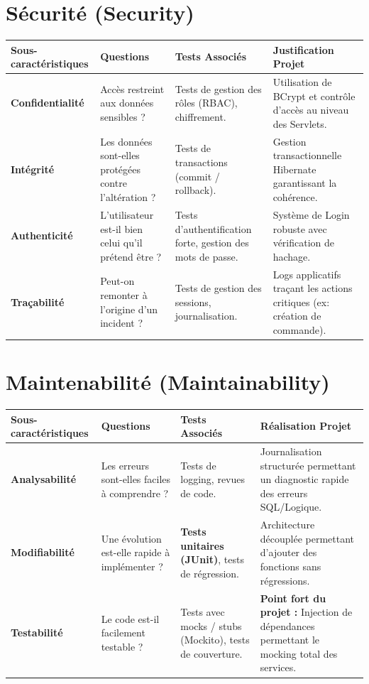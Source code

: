 \documentclass[12pt,a4paper]{report}
\begin{document}
\section{Sécurité (Security)}
\begin{table}[ht!]
\centering\small
\begin{tabular}{|p{3cm}|p{3cm}|p{4cm}|p{4cm}|}
\hline
\rowcolor{headerblue}\color{white}Sous-caractéristiques & \color{white}Questions & \color{white}Tests Associés & \color{white}Justification Projet \\ \hline
\textbf{Confidentialité} & Accès restreint aux données sensibles ? & Tests de gestion des rôles (RBAC), chiffrement. & Utilisation de BCrypt et contrôle d'accès au niveau des Servlets. \\ \hline
\textbf{Intégrité} & Les données sont-elles protégées contre l'altération ? & Tests de transactions (commit / rollback). & Gestion transactionnelle Hibernate garantissant la cohérence. \\ \hline
\textbf{Authenticité} & L'utilisateur est-il bien celui qu'il prétend être ? & Tests d'authentification forte, gestion des mots de passe. & Système de Login robuste avec vérification de hachage. \\ \hline
\textbf{Traçabilité} & Peut-on remonter à l'origine d'un incident ? & Tests de gestion des sessions, journalisation. & Logs applicatifs traçant les actions critiques (ex: création de commande). \\ \hline
\end{tabular}
\end{table}

\section{Maintenabilité (Maintainability)}
\begin{table}[ht!]
\centering\small
\begin{tabular}{|p{3.5cm}|p{3cm}|p{3.5cm}|p{4cm}|}
\hline
\rowcolor{headerblue}\color{white}Sous-caractéristiques & \color{white}Questions & \color{white}Tests Associés & \color{white}Réalisation Projet \\ \hline
\textbf{Analysabilité} & Les erreurs sont-elles faciles à comprendre ? & Tests de logging, revues de code. & Journalisation structurée permettant un diagnostic rapide des erreurs SQL/Logique. \\ \hline
\textbf{Modifiabilité} & Une évolution est-elle rapide à implémenter ? & \textbf{Tests unitaires (JUnit)}, tests de régression. & Architecture découplée permettant d'ajouter des fonctions sans régressions. \\ \hline
\textbf{Testabilité} & Le code est-il facilement testable ? & Tests avec mocks / stubs (Mockito), tests de couverture. & \textbf{Point fort du projet :} Injection de dépendances permettant le mocking total des services. \\ \hline
\end{tabular}
\end{table}
\end{document}
